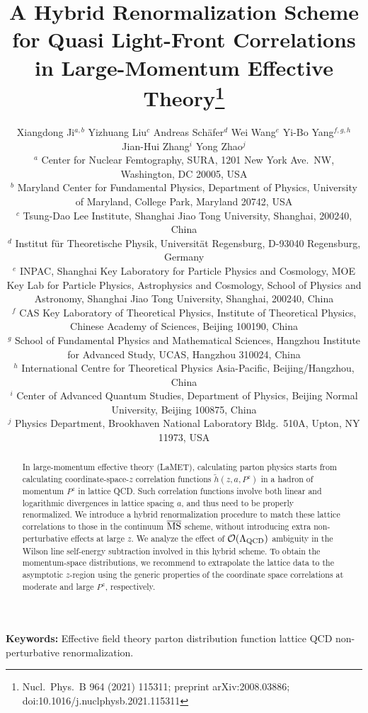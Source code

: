\documentclass[11pt]{article}
\title{A Hybrid Renormalization Scheme for Quasi Light-Front
  Correlations in Large-Momentum Effective Theory\thanks{Nucl.\ Phys.\ B
  964 (2021) 115311; preprint arXiv:2008.03886;
  doi:10.1016/j.nuclphysb.2021.115311}}
\author{
Xiangdong Ji$^{a,b}$ \quad
Yizhuang Liu$^{c}$ \quad
Andreas Sch\"{a}fer$^{d}$ \quad
Wei Wang$^{e}$ \quad
Yi-Bo Yang$^{f,g,h}$ \quad
Jian-Hui Zhang$^{i}$ \quad
Yong Zhao$^{j}$
\\[1.2em]
\normalsize
$^a$ Center for Nuclear Femtography, SURA, 1201 New York Ave.\ NW,
Washington, DC 20005, USA\\
$^b$ Maryland Center for Fundamental Physics, Department of Physics,
University of Maryland, College Park, Maryland 20742, USA\\
$^c$ Tsung-Dao Lee Institute, Shanghai Jiao Tong University, Shanghai,
200240, China\\
$^d$ Institut f\"{u}r Theoretische Physik, Universit\"{a}t Regensburg,
D-93040 Regensburg, Germany\\
$^e$ INPAC, Shanghai Key Laboratory for Particle Physics and Cosmology,
MOE Key Lab for Particle Physics, Astrophysics and Cosmology, School of
Physics and Astronomy, Shanghai Jiao Tong University, Shanghai, 200240,
China\\
$^f$ CAS Key Laboratory of Theoretical Physics, Institute of Theoretical
Physics, Chinese Academy of Sciences, Beijing 100190, China\\
$^g$ School of Fundamental Physics and Mathematical Sciences, Hangzhou
Institute for Advanced Study, UCAS, Hangzhou 310024, China\\
$^h$ International Centre for Theoretical Physics Asia-Pacific,
Beijing/Hangzhou, China\\
$^i$ Center of Advanced Quantum Studies, Department of Physics, Beijing
Normal University, Beijing 100875, China\\
$^j$ Physics Department, Brookhaven National Laboratory Bldg.\ 510A,
Upton, NY 11973, USA
}
\date{}
\begin{document}
\maketitle

\begin{abstract}
In large-momentum effective theory (LaMET), calculating parton physics starts from calculating coordinate-space-$z$ correlation functions
$\tilde h(z, a,P^z)$ in a hadron of momentum $P^z$ in lattice QCD. Such correlation functions involve
both linear and logarithmic divergences in lattice spacing $a$, and thus need to be properly renormalized.
We introduce a hybrid renormalization procedure to match these lattice
correlations to those in the continuum $\overline{\rm MS}$ scheme, without introducing extra
non-perturbative effects at large $z$. We analyze the effect of ${\cal O}(\Lambda_{\rm QCD})$ ambiguity in the Wilson line self-energy subtraction involved in this hybrid scheme. To obtain the momentum-space
distributions, we recommend to extrapolate the lattice data to
the asymptotic $z$-region using the generic properties of the
coordinate space correlations at moderate and large $P^z$, respectively.
\end{abstract}

\noindent\textbf{Keywords:} Effective field theory \textbullet{} parton
distribution function \textbullet{} lattice QCD \textbullet{}
non-perturbative renormalization.

\bigskip








\end{document}
